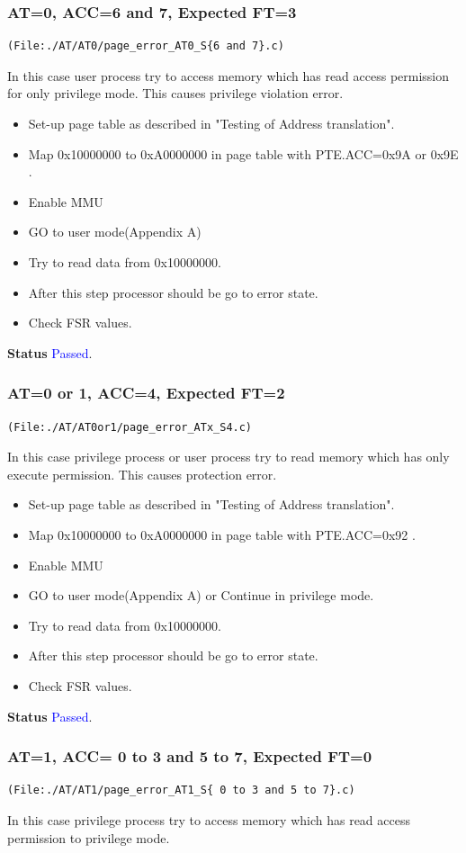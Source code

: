 \documentclass[12pt,a4paper]{article}
\begin{document}
\subsubsection{ AT=0, ACC=6 and 7, Expected FT=3}
\begin{lstlisting}
(File:./AT/AT0/page_error_AT0_S{6 and 7}.c)
\end{lstlisting}
In this case user process try to access memory which has read access permission for only privilege mode.
This causes privilege violation error.
\begin{itemize}
\item Set-up page table as described in "Testing of Address translation".
\item Map 0x10000000 to 0xA0000000 in page table with PTE.ACC=0x9A or 0x9E .
\item Enable MMU
\item GO to user mode(Appendix A) 
\item Try to read data from 0x10000000.
\item After this step processor should be go to error state. 
\item Check FSR values. 
\end{itemize}
\textbf{Status} \textcolor{blue}{Passed}.
\subsubsection{ AT=0 or 1, ACC=4, Expected FT=2}
\begin{lstlisting}
(File:./AT/AT0or1/page_error_ATx_S4.c)
\end{lstlisting}
In this case privilege process or user process try to read memory which has only execute permission. This causes protection error.

\begin{itemize}
\item Set-up page table as described in "Testing of Address translation".
\item Map 0x10000000 to 0xA0000000 in page table with PTE.ACC=0x92  .
\item Enable MMU
\item GO to user mode(Appendix A) or Continue in privilege mode. 
\item Try to read data from 0x10000000.
\item After this step processor should be go to error state.
\item Check FSR values.
\end{itemize}
\textbf{Status} \textcolor{blue}{Passed}.
\subsubsection{ AT=1, ACC= 0 to 3 and 5 to 7, Expected FT=0}
\begin{lstlisting}
(File:./AT/AT1/page_error_AT1_S{ 0 to 3 and 5 to 7}.c)
\end{lstlisting}
In this case privilege process try to access memory which has read access permission to privilege mode.
\end{document}
